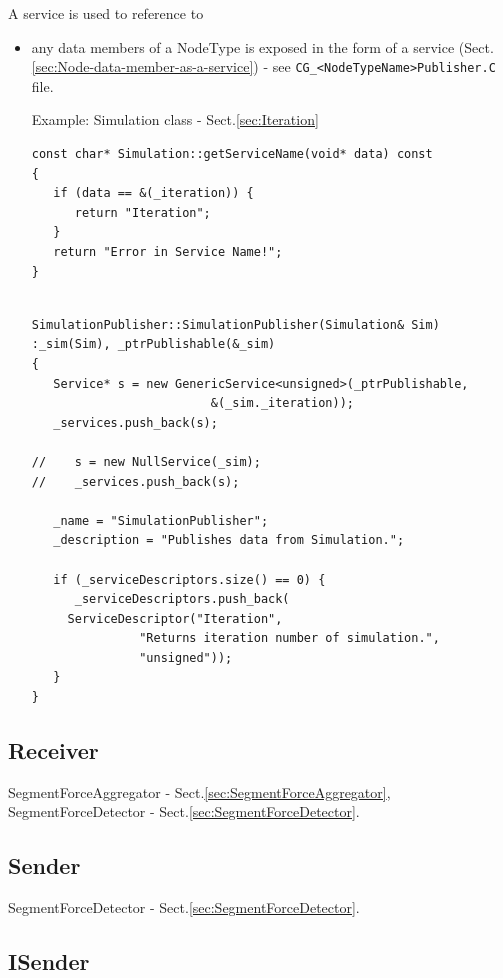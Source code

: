 A service is used to reference to
\begin{itemize}
  \item any data members of a NodeType is exposed in the form of a service
(Sect.\ref{sec:Node-data-member-as-a-service}) - see
\verb!CG_<NodeTypeName>Publisher.C! file.

Example: Simulation class - Sect.\ref{sec:Iteration}

\begin{verbatim}
const char* Simulation::getServiceName(void* data) const
{
   if (data == &(_iteration)) {
      return "Iteration";
   }
   return "Error in Service Name!";
}
\end{verbatim}

\begin{verbatim}

SimulationPublisher::SimulationPublisher(Simulation& Sim)
:_sim(Sim), _ptrPublishable(&_sim)
{
   Service* s = new GenericService<unsigned>(_ptrPublishable, 
					     &(_sim._iteration));
   _services.push_back(s);

//    s = new NullService(_sim);
//    _services.push_back(s);

   _name = "SimulationPublisher";
   _description = "Publishes data from Simulation.";

   if (_serviceDescriptors.size() == 0) {
      _serviceDescriptors.push_back(
	 ServiceDescriptor("Iteration", 
			   "Returns iteration number of simulation.",
			   "unsigned"));
   }
}
\end{verbatim}

\end{itemize}


\subsection{Receiver}
\label{sec:Receiver-MPI}

SegmentForceAggregator - Sect.\ref{sec:SegmentForceAggregator},
SegmentForceDetector - Sect.\ref{sec:SegmentForceDetector}.

\subsection{Sender}
\label{sec:Sender-MPI}

SegmentForceDetector - Sect.\ref{sec:SegmentForceDetector}.

\subsection{ISender}
\label{sec:ISender}

